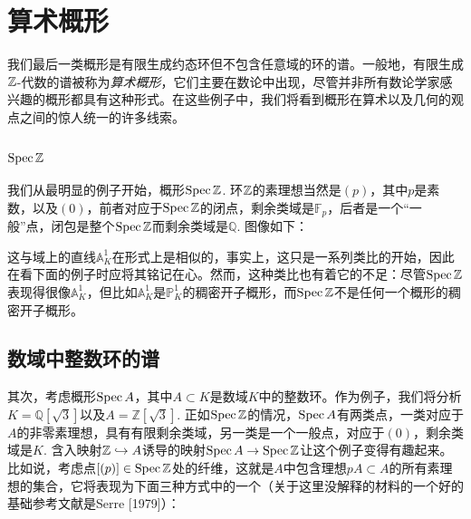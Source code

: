 \section{算术概形}

我们最后一类概形是有限生成约态环但不包含任意域的环的谱。一般地，有限生成$\mathbb{Z}$-代数的谱被称为\textit{算术概形}，它们主要在数论中出现，尽管并非所有数论学家感兴趣的概形都具有这种形式。在这些例子中，我们将看到概形在算术以及几何的观点之间的惊人统一的许多线索。\nottran

\subsection{$\operatorname{Spec} \mathbb{Z}$}

我们从最明显的例子开始，概形$\operatorname{Spec} \mathbb{Z}$. 环$\mathbb{Z}$的素理想当然是$(p)$，其中$p$是素数，以及$(0)$，前者对应于$\operatorname{Spec} \mathbb{Z}$的闭点，剩余类域是$\mathbb{F}_p$，后者是一个“一般”点，闭包是整个$\operatorname{Spec} \mathbb{Z}$而剩余类域是$\mathbb{Q}$. 图像如下：


\noindent 这与域上的直线$\mathbb{A}_K^1$在形式上是相似的，事实上，这只是一系列类比的开始，因此在看下面的例子时应将其铭记在心。然而，这种类比也有着它的不足：尽管$\operatorname{Spec} \mathbb{Z}$表现得很像$\mathbb{A}_K^1$，但比如$\mathbb{A}_K^1$是$\mathbb{P}_K^1$的稠密开子概形，而$\operatorname{Spec} \mathbb{Z}$不是任何一个概形的稠密开子概形。

\subsection{数域中整数环的谱}

其次，考虑概形$\operatorname{Spec} A$，其中$A\subset K$是数域$K$中的整数环。作为例子，我们将分析$K=\mathbb{Q}[\sqrt{3}]$以及$A=\mathbb{Z}[\sqrt{3}]$. 正如$\operatorname{Spec} \mathbb{Z}$的情况，$\operatorname{Spec} A$有两类点，一类对应于$A$的非零素理想，具有有限剩余类域，另一类是一个一般点，对应于$(0)$，剩余类域是$K$. 含入映射$\mathbb{Z}\hookrightarrow A$诱导的映射$\operatorname{Spec} A\to \operatorname{Spec} \mathbb{Z}$让这个例子变得有趣起来。比如说，考虑点$[(p)]\in \operatorname{Spec} \mathbb{Z}$处的纤维，这就是$A$中包含理想$pA\subset A$的所有素理想的集合，它将表现为下面三种方式中的一个（关于这里没解释的材料的一个好的基础参考文献是Serre [1979]）：


